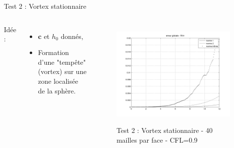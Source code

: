 \documentclass[11pt]{beamer}
\begin{document}
\begin{frame}{Test 2 : Vortex stationnaire}
\begin{columns}
Idée :

\begin{itemize}
\item $\mathbf{c}$ et $h_0$ donnés,

\item Formation d'une "tempête" (vortex) sur une zone localisée de la sphère.
\end{itemize}



\begin{figure}
\href{run:CSapprox_test1.avi}{\includegraphics[scale=0.25]{normerreur_test1_100cfl90.png}} 
\caption{Test 2 : Vortex stationnaire - 40 mailles par face - CFL=0.9}
\end{figure}
\end{columns}
\end{frame}


\end{document}
